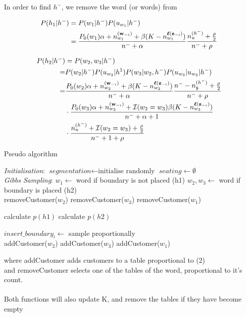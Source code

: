 In order to find $h^-$, we remove the word (or words) from 

\begin{align}
P(h_1 | h^-) &= P(w_1|h^-)P(u_{w_1} | h^{-}) \\
&= \dfrac{P_0(w_1)\alpha + n_{w_1}^{(\bm{\mathbf{w}}_{-i})}+ \beta (K - n_{w_1}^{\bm{\mathbf{\ell}}(\bm{\mathbf{z}}_{-i})})}{n^- + \alpha}
\dfrac{n_u^{(h^-)} + \frac{\rho}{2}}{n^- + \rho}
\end{align}

\begin{align}
P(h_2 | h^-) &= P(w_2,w_3|h^-)\\
=&P(w_2|h^-)P(u_{w_2}|h^1)P(w_3 | w_2,h^-)P(u_{w_3}|u_{w_2}|h^-) \\
=& \dfrac{P_0(w_2)\alpha + n_{w_2}^{(\bm{\mathbf{w}}_{-i})}+ \beta (K - n_{w_2}^{\bm{\mathbf{\ell}}(\bm{\mathbf{z}}_{-i})})}{n^- + \alpha}
\dfrac{n^- - n_\$^{(h^-)} + \frac{\rho}{2}}{n^- + \rho} \\
&\cdot 
\dfrac{P_0(w_3)\alpha + n_{w_3}^{(\bm{\mathbf{w}}_{-i})}+ \mathcal{I}(w_2 = w_3) \beta (K - n_{w_3}^{\bm{\mathbf{\ell}}(\bm{\mathbf{z}}_{-i})})}{n^- + \alpha + 1} \\
&\cdot
\dfrac{n_u^{(h^-)} + \mathcal{I}(w_2 = w_3)  + \frac{\rho}{2}}{n^- + 1 + \rho}
\end{align}

\begin{algorithm}
\caption{Pseudo algorithm}\label{euclid}
\begin{algorithmic}[1]
\BState \emph{Initialisation}:
\State $\textit{segmentation} \gets \text{initialise randomly}$
\State $seating \gets \emptyset$
\EndFor
\\
\BState \emph{Gibbs Sampling}:
	\State $w_1 \gets$ word if boundary is not placed (h1)
	\State $w_2, w_3 \gets$ word if boundary is  placed (h2)
	\\
		\State removeCustomer($w_2$)
		\State removeCustomer($w_3$)
	\Else
		\State removeCustomer($w_1$)	
	\EndIf

	\State calculate $p(h1)$
	\State calculate $p(h2)$
	
	\State $insert\_boundary_i \gets$ sample proportionally
	\\
		\State addCustomer($w_2$)
		\State addCustomer($w _3$)
	\Else 
		\State addCustomer($w_1$)	
	\EndIf
\EndFor
\EndProcedure
\end{algorithmic}
\end{algorithm}

	
where addCustomer adds customers to a table proportional to (2) \\
and removeCustomer selects one of the tables of the word, proportional to it's count. \\
\\
Both functions will also update K, and remove the tables if they have become empty